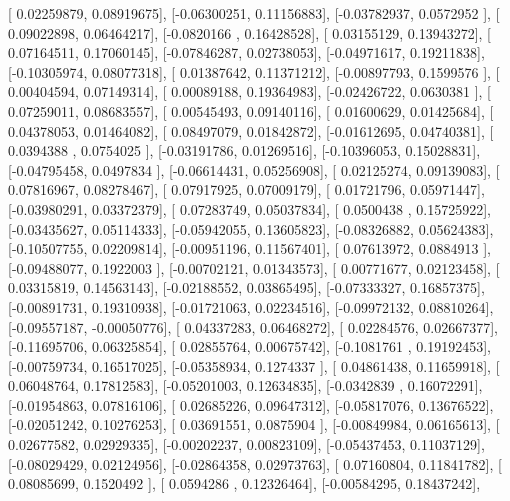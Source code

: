 \documentclass{article}
\begin{document}
       [ 0.02259879,  0.08919675],
       [-0.06300251,  0.11156883],
       [-0.03782937,  0.0572952 ],
       [ 0.09022898,  0.06464217],
       [-0.0820166 ,  0.16428528],
       [ 0.03155129,  0.13943272],
       [ 0.07164511,  0.17060145],
       [-0.07846287,  0.02738053],
       [-0.04971617,  0.19211838],
       [-0.10305974,  0.08077318],
       [ 0.01387642,  0.11371212],
       [-0.00897793,  0.1599576 ],
       [ 0.00404594,  0.07149314],
       [ 0.00089188,  0.19364983],
       [-0.02426722,  0.0630381 ],
       [ 0.07259011,  0.08683557],
       [ 0.00545493,  0.09140116],
       [ 0.01600629,  0.01425684],
       [ 0.04378053,  0.01464082],
       [ 0.08497079,  0.01842872],
       [-0.01612695,  0.04740381],
       [ 0.0394388 ,  0.0754025 ],
       [-0.03191786,  0.01269516],
       [-0.10396053,  0.15028831],
       [-0.04795458,  0.0497834 ],
       [-0.06614431,  0.05256908],
       [ 0.02125274,  0.09139083],
       [ 0.07816967,  0.08278467],
       [ 0.07917925,  0.07009179],
       [ 0.01721796,  0.05971447],
       [-0.03980291,  0.03372379],
       [ 0.07283749,  0.05037834],
       [ 0.0500438 ,  0.15725922],
       [-0.03435627,  0.05114333],
       [-0.05942055,  0.13605823],
       [-0.08326882,  0.05624383],
       [-0.10507755,  0.02209814],
       [-0.00951196,  0.11567401],
       [ 0.07613972,  0.0884913 ],
       [-0.09488077,  0.1922003 ],
       [-0.00702121,  0.01343573],
       [ 0.00771677,  0.02123458],
       [ 0.03315819,  0.14563143],
       [-0.02188552,  0.03865495],
       [-0.07333327,  0.16857375],
       [-0.00891731,  0.19310938],
       [-0.01721063,  0.02234516],
       [-0.09972132,  0.08810264],
       [-0.09557187, -0.00050776],
       [ 0.04337283,  0.06468272],
       [ 0.02284576,  0.02667377],
       [-0.11695706,  0.06325854],
       [ 0.02855764,  0.00675742],
       [-0.1081761 ,  0.19192453],
       [-0.00759734,  0.16517025],
       [-0.05358934,  0.1274337 ],
       [ 0.04861438,  0.11659918],
       [ 0.06048764,  0.17812583],
       [-0.05201003,  0.12634835],
       [-0.0342839 ,  0.16072291],
       [-0.01954863,  0.07816106],
       [ 0.02685226,  0.09647312],
       [-0.05817076,  0.13676522],
       [-0.02051242,  0.10276253],
       [ 0.03691551,  0.0875904 ],
       [-0.00849984,  0.06165613],
       [ 0.02677582,  0.02929335],
       [-0.00202237,  0.00823109],
       [-0.05437453,  0.11037129],
       [-0.08029429,  0.02124956],
       [-0.02864358,  0.02973763],
       [ 0.07160804,  0.11841782],
       [ 0.08085699,  0.1520492 ],
       [ 0.0594286 ,  0.12326464],
       [-0.00584295,  0.18437242],
\end{document}

